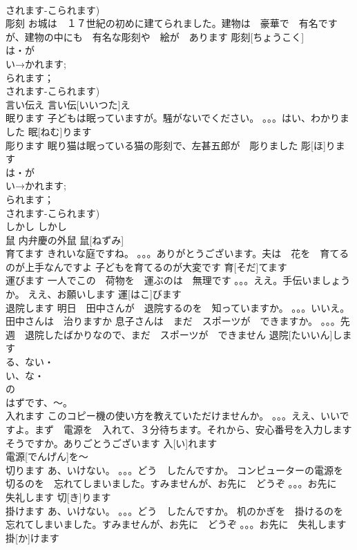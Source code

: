 \documentclass[8pt]{extreport}
\begin{document}
\begin{CJK}{UTF8}{min}
\\	されます-こられます)
\\	彫刻	お城は　１７世紀の初めに建てられました。建物は　豪華で　有名ですが、建物の中にも　有名な彫刻や　絵が　あります	彫刻[ちょうこく]			
\\	は・が
\\	い→かれます;
\\	られます；
\\	されます-こられます)
\\	言い伝え		言い伝[いいつた]え					
\\	眠ります	子どもは眠っていますが。騒がないでください。 。。。はい、わかりました	眠[ねむ]ります			
\\	彫ります	眠り猫は眠っている猫の彫刻で、左甚五郎が　彫りました	彫[ほ]ります			
\\	は・が
\\	い→かれます;
\\	られます；
\\	されます-こられます)
\\	しかし		しかし						
\\	鼠	内弁慶の外鼠	鼠[ねずみ]			
\\	育てます	きれいな庭ですね。 。。。ありがとうございます。夫は　花を　育てるのが上手なんですよ 子どもを育てるのが大変です	育[そだ]てます			
\\	運びます	一人でこの　荷物を　運ぶのは　無理です 。。。ええ。手伝いましょうか。 ええ、お願いします	運[はこ]びます			
\\	退院します	明日　田中さんが　退院するのを　知っていますか。 。。。いいえ。田中さんは　治りますか 息子さんは　まだ　スポーツが　できますか。 。。。先週　退院したばかりなので、まだ　スポーツが　できません	退院[たいいん]します			
\\	る、ない・
\\	い、な・
\\	の
\\	はずです、～。
\\	入れます	このコピー機の使い方を教えていただけませんか。 。。。ええ、いいですよ。まず　電源を　入れて、３分待ちます。それから、安心番号を入力します そうですか。ありごとうございます	入[い]れます			
\\	電源[でんげん]を～	
\\	切ります	あ、いけない。 。。。どう　したんですか。 コンピューターの電源を　切るのを　忘れてしまいました。すみませんが、お先に　どうぞ 。。。お先に　失礼します	切[き]ります			
\\	掛けます	あ、いけない。 。。。どう　したんですか。 机のかぎを　掛けるのを　忘れてしまいました。すみませんが、お先に　どうぞ 。。。お先に　失礼します	掛[か]けます			

\end{CJK}
\end{document}
